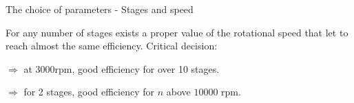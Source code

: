 \documentclass{beamer}
\newcommand{\myspaceneg}[0]{\vspace{-0.15cm}}
\begin{document}
\begin{frame}[t]{The choice of parameters - Stages and speed}

\myspaceneg
\myspaceneg
For any number of stages exists a proper value of the rotational speed that let to reach almost the same efficiency.
Critical decision:

$\Rightarrow$ at $3000 \text{rpm}$, good efficiency for over 10 stages.

$\Rightarrow$ for 2 stages, good efficiency for $n$ above $10000 \text{ rpm}$.

\vspace{-0.8cm}
\begin{figure}%
    \centering
\end{figure}
\end{frame}
\end{document}
